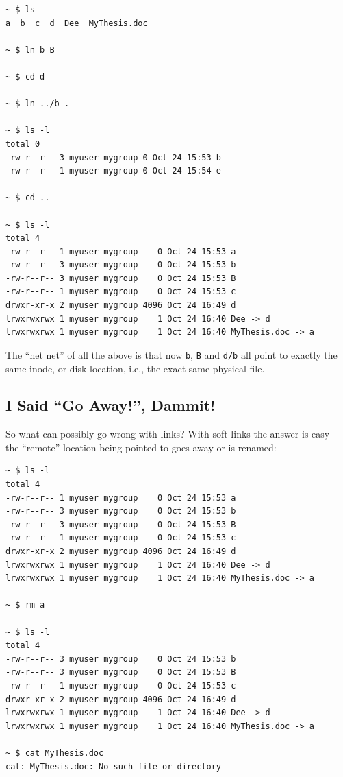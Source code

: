 \documentclass[10pt,]{book}
\numberwithin{figure}{chapter}
\begin{document}
\begin{verbatim}
~ $ ls
a  b  c  d  Dee  MyThesis.doc

~ $ ln b B

~ $ cd d

~ $ ln ../b .

~ $ ls -l
total 0
-rw-r--r-- 3 myuser mygroup 0 Oct 24 15:53 b
-rw-r--r-- 1 myuser mygroup 0 Oct 24 15:54 e

~ $ cd ..

~ $ ls -l
total 4
-rw-r--r-- 1 myuser mygroup    0 Oct 24 15:53 a
-rw-r--r-- 3 myuser mygroup    0 Oct 24 15:53 b
-rw-r--r-- 3 myuser mygroup    0 Oct 24 15:53 B
-rw-r--r-- 1 myuser mygroup    0 Oct 24 15:53 c
drwxr-xr-x 2 myuser mygroup 4096 Oct 24 16:49 d
lrwxrwxrwx 1 myuser mygroup    1 Oct 24 16:40 Dee -> d
lrwxrwxrwx 1 myuser mygroup    1 Oct 24 16:40 MyThesis.doc -> a
\end{verbatim}

The ``net net'' of all the above is that now \texttt{b}, \texttt{B} and
\texttt{d/b} all point to exactly the same inode, or disk location,
i.e., the exact same physical file.

\subsection{I Said ``Go Away!'', Dammit!}\label{i-said-go-away-dammit}

So what can possibly go wrong with links? With soft links the answer is
easy - the ``remote'' location being pointed to goes away or is renamed:

\begin{verbatim}
~ $ ls -l
total 4
-rw-r--r-- 1 myuser mygroup    0 Oct 24 15:53 a
-rw-r--r-- 3 myuser mygroup    0 Oct 24 15:53 b
-rw-r--r-- 3 myuser mygroup    0 Oct 24 15:53 B
-rw-r--r-- 1 myuser mygroup    0 Oct 24 15:53 c
drwxr-xr-x 2 myuser mygroup 4096 Oct 24 16:49 d
lrwxrwxrwx 1 myuser mygroup    1 Oct 24 16:40 Dee -> d
lrwxrwxrwx 1 myuser mygroup    1 Oct 24 16:40 MyThesis.doc -> a

~ $ rm a

~ $ ls -l
total 4
-rw-r--r-- 3 myuser mygroup    0 Oct 24 15:53 b
-rw-r--r-- 3 myuser mygroup    0 Oct 24 15:53 B
-rw-r--r-- 1 myuser mygroup    0 Oct 24 15:53 c
drwxr-xr-x 2 myuser mygroup 4096 Oct 24 16:49 d
lrwxrwxrwx 1 myuser mygroup    1 Oct 24 16:40 Dee -> d
lrwxrwxrwx 1 myuser mygroup    1 Oct 24 16:40 MyThesis.doc -> a

~ $ cat MyThesis.doc 
cat: MyThesis.doc: No such file or directory
\end{verbatim}
\end{document}

